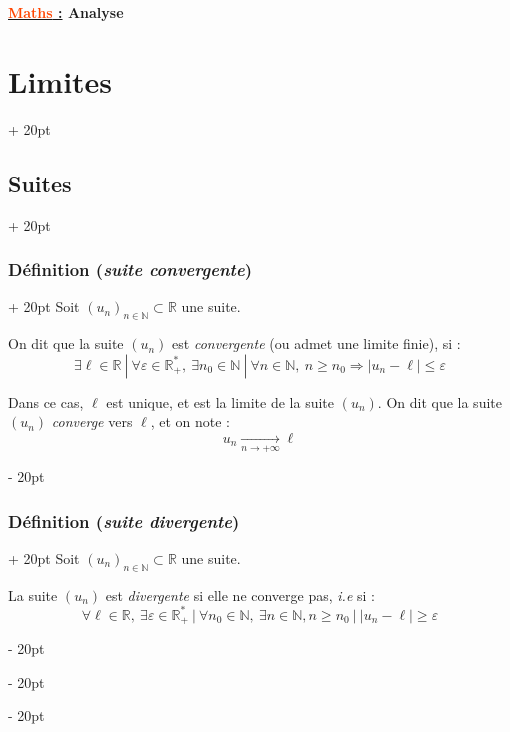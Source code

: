 \documentclass[a4paper, 12pt, twoside]{article}
\renewcommand{\emph}{\textcolor{ff4500}}
\newcommand{\N}{\mathbb{N}} %
\newcommand{\R}{\mathbb{R}} %
\newcommand{\tendsto}[1]{\xrightarrow[#1]{}}
\newcommand{\abs}[1]{\left\lvert #1 \right\rvert}
\renewcommand{\le}{\leqslant}
\renewcommand{\ge}{\geqslant}
\newcommand{\ep}{\varepsilon}
\newcommand{\ind}[1][20pt]{\advance\leftskip + #1}
\newcommand{\deind}[1][20pt]{\advance\leftskip - #1}
\newenvironment{indt}[2][20pt]{#2 \par \ind[#1]}{\par \deind} %
\newcommand{\thetitle}[2]{\begin{center}\textbf{{\LARGE \underline{\emph{#1} :}} {\Large #2}}\end{center}}
\begin{document}
    
    
    \thetitle{Maths}{Analyse}
    
    \tableofcontents
    \newpage
    
    
    \begin{indt}{\section{Limites}}
        
        \begin{indt}{\subsection{Suites}}
            \begin{indt}{\subsubsection{Définition (\textit{suite convergente})}}
                Soit $(u_n)_{n \in \N} \subset \R$ une suite.

                On dit que la suite $(u_n)$ est \textit{convergente} (ou admet une limite finie), si :
                \[
                    \exists \ell \in \R\ |\ \forall \varepsilon \in \R^*_+,\ \exists n_0 \in \N\ |\ \forall n \in \N,\ n \ge n_0 \Rightarrow \abs{u_n - \ell} \le \varepsilon
                \]

                Dans ce cas, $\ell$ est unique, et est la limite de la suite $(u_n)$. On dit que la suite $(u_n)$ \textit{converge} vers $\ell$, et on note :
                \[
                    u_n \tendsto{n \to +\infty} \ell
                \]
            \end{indt}

            \vspace{12pt}
            
            \begin{indt}{\subsubsection{Définition (\textit{suite divergente})}}
                Soit $(u_n)_{n \in \N} \subset \R$ une suite.

                La suite $(u_n)$ est \textit{divergente} si elle ne converge pas, \textit{i.e} si :
                \[
                    \forall \ell \in \R,\ \exists \ep \in \R^*_+\ |\ \forall n_0 \in \N,\ \exists n \in \N, n \ge n_0\ |\ \abs{u_n - \ell} \ge \ep
                \]
            \end{indt}


\end{indt}
\end{indt}
\end{document}
